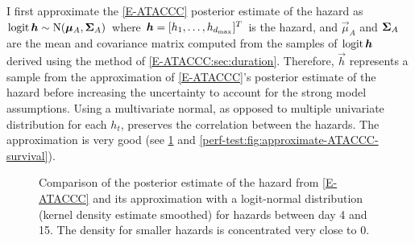 \documentclass[thesis.tex]{subfiles}
\begin{document}
I first approximate the \cref{E-ATACCC} posterior estimate of the hazard as $\operatorname{logit}{\bm{h}} \sim \operatorname{N}(\bm{\mu}_A, \bm{\Sigma}_A)$ where $\bm{h} = [h_1, \dots, h_{d_\text{max}}]^T$ is the hazard, and $\vec{\mu}_A$ and $\bm{\Sigma}_A$ are the mean and covariance matrix computed from the samples of $\operatorname{logit}{\bm{h}}$ derived using the method of \cref{E-ATACCC:sec:duration}.
Therefore, $\vec{h}$ represents a sample from the approximation of \cref{E-ATACCC}'s posterior estimate of the hazard before increasing the uncertainty to account for the strong model assumptions.
Using a multivariate normal, as opposed to multiple univariate distribution for each $h_t$, preserves the correlation between the hazards.
The approximation is very good (see \cref{perf-test:fig:approximate-ATACCC-hazard} and \cref{perf-test:fig:approximate-ATACCC-survival}).
\begin{figure}
  \caption[Approximating the ATACCC posterior hazard as a logit-normal]{Comparison of the posterior estimate of the hazard from \cref{E-ATACCC} and its approximation with a logit-normal distribution (kernel density estimate smoothed) for hazards between day 4 and 15. The density for smaller hazards is concentrated very close to 0. \label{perf-test:fig:approximate-ATACCC-hazard}}
\end{figure}
\end{document}
